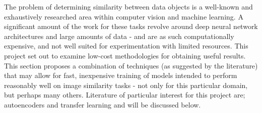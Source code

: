 The problem of determining similarity between data objects is a well-known and exhaustively researched area within computer vision and machine learning. 
A significant amount of the work for these tasks revolve around deep neural network architectures and large amounts of data - and are as such computationally expensive, and not well suited for experimentation with limited resources.
This project set out to examine low-cost methodologies for obtaining useful results. 
This section proposes a combination of techniques (as suggested by the literature) that may allow for fast, inexpensive training of models intended to perform reasonably well on image similarity tasks - not only for this particular domain, but perhaps many others.
Literature of particular interest for this project are; autoencoders and transfer learning and will be discussed below.

